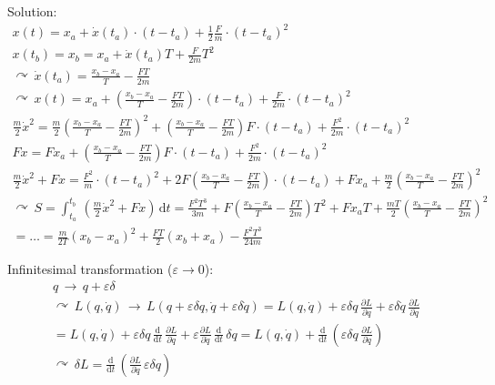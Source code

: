 \documentclass[fontsize=11pt,a4paper]{scrartcl}
\begin{document}
Solution:
\begin{gather*}
	x(t)=x_a+\dot x(t_a)\cdot(t-t_a)+\frac{1}{2}\frac{F}{m}\cdot(t-t_a)^2\\
	x(t_b)=x_b=x_a+\dot x(t_a)T+\frac{F}{2m}T^2\\
	\curvearrowright\,\dot x(t_a)=\frac{x_b-x_a}{T}-\frac{FT}{2m}\\
	\curvearrowright\,x(t)=x_a+\left(\frac{x_b-x_a}{T}-\frac{FT}{2m}\right)\cdot(t-t_a)+\frac{F}{2m}\cdot(t-t_a)^2\\
	\frac{m}{2}\dot x^2=\frac{m}{2}\left(\frac{x_b-x_a}{T}-\frac{FT}{2m}\right)^2+\left(\frac{x_b-x_a}{T}-\frac{FT}{2m}\right)F\cdot(t-t_a)+\frac{F^2}{2m}\cdot(t-t_a)^2\\
	Fx=Fx_a+\left(\frac{x_b-x_a}{T}-\frac{FT}{2m}\right)F\cdot(t-t_a)+\frac{F^2}{2m}\cdot(t-t_a)^2\\
	\frac{m}{2}\dot x^2+Fx=\frac{F^2}{m}\cdot(t-t_a)^2+2F\left(\frac{x_b-x_a}{T}-\frac{FT}{2m}\right)\cdot(t-t_a)+Fx_a+\frac{m}{2}\left(\frac{x_b-x_a}{T}-\frac{FT}{2m}\right)^2\\
	\curvearrowright\,S=\int_{t_a}^{t_b}\,\left(\frac{m}{2}\dot x^2+Fx\right)\,\mathrm{d}t=\frac{F^2 T^3}{3m}+F\left(\frac{x_b-x_a}{T}-\frac{FT}{2m}\right)T^2+Fx_a T+\frac{mT}{2}\left(\frac{x_b-x_a}{T}-\frac{FT}{2m}\right)^2\\
	=\dots=\frac{m}{2T}(x_b-x_a)^2+\frac{FT}{2}(x_b+x_a)-\frac{F^2 T^3}{24m}
\end{gather*}


Infinitesimal transformation ($\varepsilon\to 0$):
\begin{gather*}
	q\,\to\,q+\varepsilon\delta\\
	\curvearrowright\,L(q,\dot q)\,\to\,L(q+\varepsilon\delta q,\dot q+\varepsilon\delta\dot q)=L(q,\dot q)+\varepsilon\delta q\,\frac{\partial L}{\partial q}+\varepsilon\delta\dot q\,\frac{\partial L}{\partial\dot q}\\=L(q,\dot q)+\varepsilon\delta q\,\frac{\mathrm{d}}{\mathrm{d}t}\,\frac{\partial L}{\partial\dot q}+\varepsilon\frac{\partial L}{\partial\dot q}\,\frac{\mathrm{d}}{\mathrm{d}t}\,\delta q
	=L(q,\dot q)+\frac{\mathrm{d}}{\mathrm{d}t}\,\left(\varepsilon\delta q\,\frac{\partial L}{\partial\dot q}\right)\\
	\curvearrowright\,\delta L=\frac{\mathrm{d}}{\mathrm{d}t}\,\left(\frac{\partial L}{\partial\dot q}\,\varepsilon\delta q\right)
\end{gather*}
\end{document}
